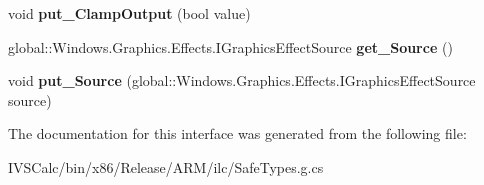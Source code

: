 \begin{DoxyCompactItemize}
void {\bfseries put\+\_\+\+Clamp\+Output} (bool value)
\item 
\mbox{\label{interface_microsoft_1_1_graphics_1_1_canvas_1_1_effects_1_1_i_convolve_matrix_effect_a3db9cc0d5d797ce3307cc5f93aac58c3}} 
global\+::\+Windows.\+Graphics.\+Effects.\+I\+Graphics\+Effect\+Source {\bfseries get\+\_\+\+Source} ()
\item 
\mbox{\label{interface_microsoft_1_1_graphics_1_1_canvas_1_1_effects_1_1_i_convolve_matrix_effect_aa2e57e481287adea1356db1184a275e8}} 
void {\bfseries put\+\_\+\+Source} (global\+::\+Windows.\+Graphics.\+Effects.\+I\+Graphics\+Effect\+Source source)
\end{DoxyCompactItemize}


The documentation for this interface was generated from the following file\+:\begin{DoxyCompactItemize}
\item 
I\+V\+S\+Calc/bin/x86/\+Release/\+A\+R\+M/ilc/Safe\+Types.\+g.\+cs\end{DoxyCompactItemize}
